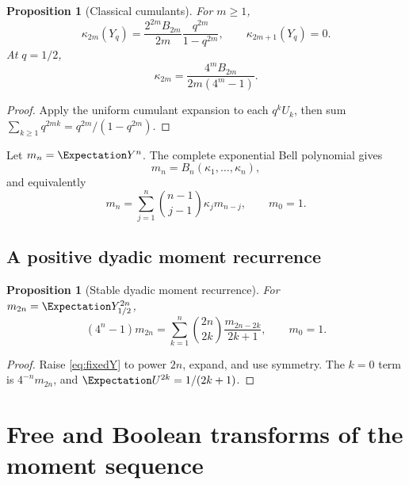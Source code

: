 \documentclass[11pt,oneside]{article}
\newtheorem{proposition}[theorem]{Proposition}
\theoremstyle{definition}
\theoremstyle{remark}
\begin{document}
\begin{proposition}[Classical cumulants]\label{prop:classicalq}
For \(m\ge1\),
\begin{equation}\label{eq:kappaq}
\kappa_{2m}(Y_q)=\frac{2^{2m}B_{2m}}{2m}\frac{q^{2m}}{1-q^{2m}},
\qquad \kappa_{2m+1}(Y_q)=0.
\end{equation}
At \(q=1/2\),
\begin{equation}\label{eq:kappadyadic}
\kappa_{2m}=\frac{4^mB_{2m}}{2m(4^m-1)}.
\end{equation}
\end{proposition}
\begin{proof}
Apply the uniform cumulant expansion to each \(q^kU_k\), then sum \(\sum_{k\ge1}q^{2mk}=q^{2m}/(1-q^{2m})\).
\end{proof}

Let \(m_n=\Expectation Y^n\). The complete exponential Bell polynomial gives
\begin{equation}\label{eq:bellmoment}
m_n=B_n(\kappa_1,\ldots,\kappa_n),
\end{equation}
and equivalently
\begin{equation}\label{eq:momentcumrec}
m_n=\sum_{j=1}^n\binom{n-1}{j-1}\kappa_jm_{n-j},\qquad m_0=1.
\end{equation}

\subsection{A positive dyadic moment recurrence}
\begin{proposition}[Stable dyadic moment recurrence]\label{prop:momentrec}
For \(m_{2n}=\Expectation Y_{1/2}^{2n}\),
\begin{equation}\label{eq:dyadicmomentrec}
(4^n-1)m_{2n}=\sum_{k=1}^n\binom{2n}{2k}\frac{m_{2n-2k}}{2k+1},\qquad m_0=1.
\end{equation}
\end{proposition}
\begin{proof}
Raise \eqref{eq:fixedY} to power \(2n\), expand, and use symmetry. The \(k=0\) term is \(4^{-n}m_{2n}\), and \(\Expectation U^{2k}=1/(2k+1)\).
\end{proof}

\section{Free and Boolean transforms of the moment sequence}
\end{document}
